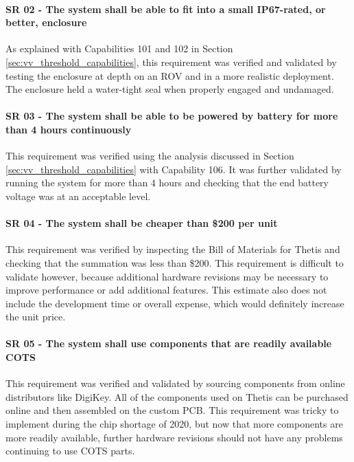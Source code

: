 \paragraph*{SR 02 - The system shall be able to fit into a small IP67-rated, or better, enclosure} As explained with Capabilities 101 and 102 in Section \ref{sec:vv_threshold_capabilities}, this requirement was verified and validated by testing the enclosure at depth on an ROV and in a more realistic deployment.
The enclosure held a water-tight seal when properly engaged and undamaged.

\paragraph*{SR 03 - The system shall be able to be powered by battery for more than 4 hours continuously} This requirement was verified using the analysis discussed in Section \ref{sec:vv_threshold_capabilities} with Capability 106. 
It was further validated by running the system for more than 4 hours and checking that the end battery voltage was at an acceptable level.

\paragraph*{SR 04 - The system shall be cheaper than \$200 per unit} This requirement was verified by inspecting the Bill of Materials for Thetis and checking that the summation was less than \$200.
This requirement is difficult to validate however, because additional hardware revisions may be necessary to improve performance or add additional features.
This estimate also does not include the development time or overall expense, which would definitely increase the unit price.

\paragraph*{SR 05 - The system shall use components that are readily available COTS} This requirement was verified and validated by sourcing components from online distributors like DigiKey.
All of the components used on Thetis can be purchased online and then assembled on the custom PCB. 
This requirement was tricky to implement during the chip shortage of 2020, but now that more components are more readily available, further hardware revisions should not have any problems continuing to use COTS parts.


